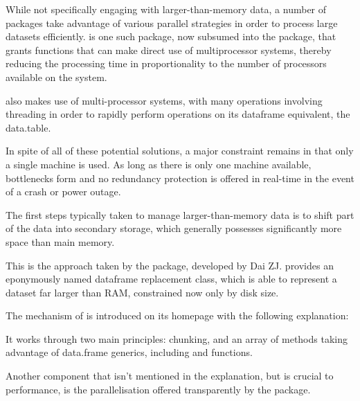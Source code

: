 
While not specifically engaging with larger-than-memory data, a number
of packages take advantage of various parallel strategies in order to
process large datasets efficiently.  is one such
package, now subsumed into the  package, that grants
functions that can make direct use of multiprocessor systems, thereby
reducing the processing time in proportionality to the number of
processors available on the system.

 also makes use of multi-processor systems, with many
operations involving threading in order to rapidly perform operations on
its dataframe equivalent, the data.table.

In spite of all of these potential solutions, a major constraint remains
in that only a single machine is used. As long as there is only one
machine available, bottlenecks form and no redundancy protection is
offered in real-time in the event of a crash or power outage.

The first steps typically taken to manage larger-than-memory data is to
shift part of the data into secondary storage, which generally possesses
significantly more space than main memory.

This is the approach taken by the  package, developed
by Dai ZJ.  provides an eponymously named dataframe
replacement class, which is able to represent a dataset far larger than
RAM, constrained now only by disk size\cite{zj20}.

The mechanism of  is introduced on its homepage with the
following explanation:


It works through two main principles: chunking, and an array of methods
taking advantage of data.frame generics, including  and
 functions.

Another component that isn't mentioned in the explanation, but is
crucial to performance, is the parallelisation offered transparently by
the package.

